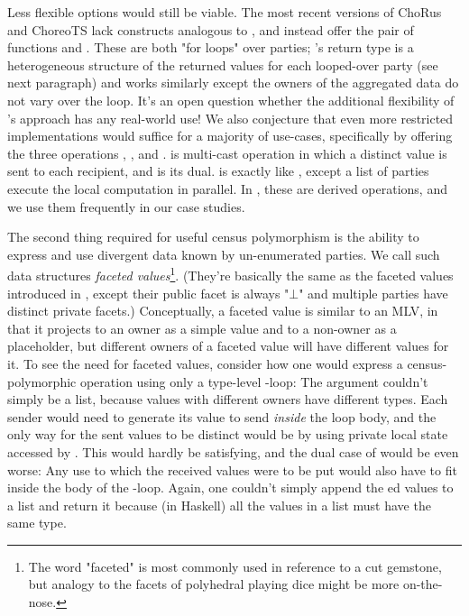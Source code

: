 Less flexible options would still be viable.
The most recent versions of ChoRus and ChoreoTS lack constructs analogous to ,
and instead offer the pair of functions  and \cite{batesenclaves}.
These are both "for loops" over parties;
's return type is a heterogeneous structure of the returned values for each looped-over party
(see next paragraph)
and  works similarly except the owners of the aggregated data do not vary over the loop.
It's an open question whether the additional flexibility of \MultiChor's approach has any real-world use!
We also conjecture that even more restricted implementations would suffice for a majority of use-cases,
specifically by offering the three operations , , and .
 is multi-cast operation in which a distinct value is sent to each recipient, and  is its dual.
 is exactly like , except a list of parties execute the local computation in parallel.
In \MultiChor, these are derived operations, and we use them frequently in our case studies.

The second thing required for useful census polymorphism is the ability to express and use divergent data known by un-enumerated parties.
We call such data structures \emph{faceted values}\footnote{
    The word "faceted" is most commonly used in reference to a cut gemstone,
    but analogy to the facets of polyhedral playing dice might be more on-the-nose.
}.
(They're basically the same as the faceted values introduced in \cite{austin2012},
except their public facet is always "$\bot$" and multiple parties have distinct private facets.)
Conceptually, a faceted value is similar to an MLV,
in that
it projects to an owner as a simple value and to a non-owner as a placeholder,
but different owners of a faceted value will have different values for it.
To see the need for faceted values, consider how one would express a census-polymorphic  operation
using only a type-level -loop:
The argument couldn't simply be a list,
because  values with different owners have different types.
Each sender would need to generate its value to send \emph{inside} the loop body,
and the only way for the sent values to be distinct would be by using private local state accessed by .
This would hardly be satisfying, and the dual case of  would be even worse:
Any use to which the received values were to be put would also have to fit inside the body of the -loop.
Again, one couldn't simply append the ed values to a list and return it
because (in Haskell) all the values in a list must have the same type.

